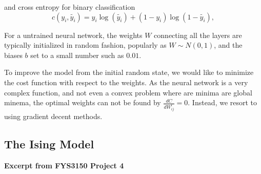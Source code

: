 and cross entropy for binary classification
\begin{equation}\label{eq:square_loss}
    c(y_i, \tilde{y_i}) = y_i\log(\tilde{y_i}) + (1 - y_i)\log(1 - \tilde{y_i}),
\end{equation}

For a untrained neural network, the weights $W$ connecting all the layers are typically initialized in random fashion, popularly as $W \sim N(0,1)$, and the biases $b$ set to a small number such as $0.01$. 

To improve the model from the initial random state, we would like to minimize the cost function with respect to the weights. As the neural network is a very complex function, and not even a convex problem where are minima are global minema, the optimal weights can not be found by $\frac{dC}{dW^l_{ij}} = 0$. Instead, we resort to using gradient decent methods.




\subsection{The Ising Model}\label{sec:ising theory}


\textbf{Excerpt from FYS3150 Project 4}

